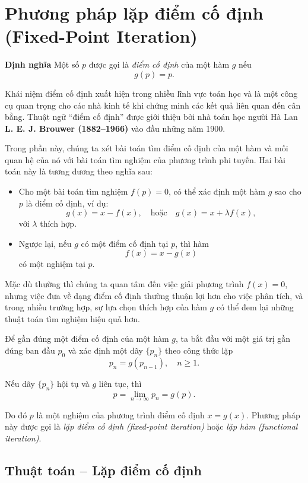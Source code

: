 \section{Phương pháp lặp điểm cố định (Fixed-Point Iteration)}

\textbf{Định nghĩa} Một số $p$ được gọi là \textit{điểm cố định} của một hàm $g$ nếu 
\[
g(p) = p.
\]

Khái niệm điểm cố định xuất hiện trong nhiều lĩnh vực toán học và là một công cụ quan trọng cho các nhà kinh tế khi chứng minh các kết quả liên quan đến cân bằng. Thuật ngữ “điểm cố định” được giới thiệu bởi nhà toán học người Hà Lan \textbf{L. E. J. Brouwer (1882–1966)} vào đầu những năm 1900.

Trong phần này, chúng ta xét bài toán tìm điểm cố định của một hàm và mối quan hệ của nó với bài toán tìm nghiệm của phương trình phi tuyến. Hai bài toán này là tương đương theo nghĩa sau:

\begin{itemize}
  \item Cho một bài toán tìm nghiệm $f(p) = 0$, có thể xác định một hàm $g$ sao cho $p$ là điểm cố định, ví dụ:
  \[
  g(x) = x - f(x), 
  \quad \text{hoặc} \quad 
  g(x) = x + \lambda f(x),
  \]
  với $\lambda$ thích hợp.
  \item Ngược lại, nếu $g$ có một điểm cố định tại $p$, thì hàm
  \[
  f(x) = x - g(x)
  \]
  có một nghiệm tại $p$.
\end{itemize}

Mặc dù thường thì chúng ta quan tâm đến việc giải phương trình $f(x) = 0$, nhưng việc đưa về dạng điểm cố định thường thuận lợi hơn cho việc phân tích, và trong nhiều trường hợp, sự lựa chọn thích hợp của hàm $g$ có thể đem lại những thuật toán tìm nghiệm hiệu quả hơn.

Để gần đúng một điểm cố định của một hàm $g$, ta bắt đầu với một giá trị gần đúng ban đầu $p_0$ và xác định một dãy $\{p_n\}$ theo công thức lặp
\[
p_n = g(p_{n-1}), \quad n \geq 1.
\]

Nếu dãy $\{p_n\}$ hội tụ và $g$ liên tục, thì
\[
p = \lim_{n \to \infty} p_n = g(p).
\]

Do đó $p$ là một nghiệm của phương trình điểm cố định $x = g(x)$.  
Phương pháp này được gọi là \textit{lặp điểm cố định (fixed-point iteration)} hoặc \textit{lặp hàm (functional iteration)}.


\subsection*{\textbf{Thuật toán – Lặp điểm cố định}}

